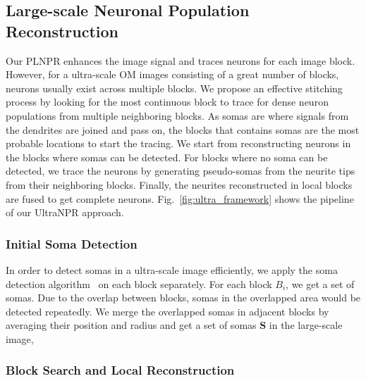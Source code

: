 \subsection{Large-scale Neuronal Population Reconstruction}
\label{sec:UltraNPR}



Our PLNPR enhances the image signal and traces neurons for each image block.
However, for a ultra-scale OM images consisting of a great number of blocks, neurons usually exist across multiple blocks. 
We propose an effective stitching process by looking for the most continuous block to trace for dense neuron populations from multiple neighboring blocks. 
%
As somas are where signals from the dendrites are joined and pass on, the blocks that contains somas are the most probable locations to start the tracing.
We start from reconstructing neurons in the blocks where somas can be detected.
For blocks where no soma can be detected, we trace the neurons by generating pseudo-somas from the neurite tips from their neighboring blocks. 
%
Finally, the neurites reconstructed in local blocks are fused to get complete neurons. 
Fig.~\ref{fig:ultra_framework} shows the pipeline of our UltraNPR approach. 


\subsubsection{Initial Soma Detection}
\label{sec:soma}

In order to detect somas in a ultra-scale image efficiently, we apply the soma detection algorithm~\cite{Quan2013} on each block separately. 
%
For each block $B_{i}$, we get a set of somas.
Due to the overlap between blocks, somas in the overlapped area would be detected repeatedly.
We merge the overlapped somas in adjacent blocks by averaging their position and radius and get a set of somas $\mathbf{S} $ in the large-scale image, 


\subsubsection{Block Search and Local Reconstruction}
\label{sec:trace}

